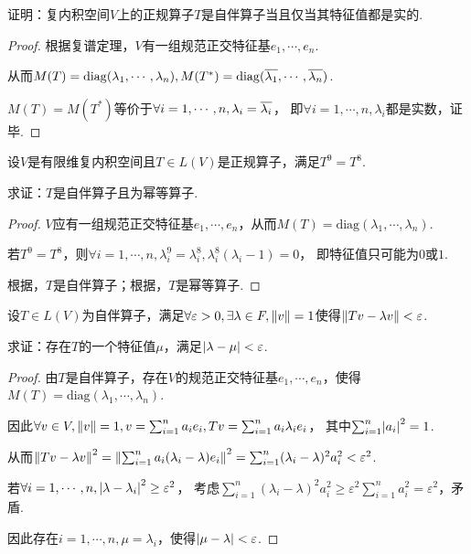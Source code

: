 \begin{problem}[6]\label{7.B.6}
    证明：复内积空间\(V\)上的正规算子\(T\)是自伴算子当且仅当其特征值都是实的.
\end{problem}

\begin{proof}
    根据复谱定理，\(V\)有一组规范正交特征基\(e_1,\cdots,e_n\).

    从而\(M(T)=\mathrm{diag}(\lambda_1,\cdots,\lambda_n),M(T^*)=\mathrm{diag}(\ol{\lambda_1},\cdots,\ol{\lambda_n})\).
    
    \(M(T)=M(T^*)\)等价于\(\forall i=1,\cdots,n,\lambda_i=\ol{\lambda_i}\)，
    即\(\forall i=1,\cdots,n,\lambda_i\)都是实数，证毕.
\end{proof}

\begin{problem}[8]\label{7.B.8}
    设\(V\)是有限维复内积空间且\(T \in L(V)\)是正规算子，满足\(T^9=T^8\).

    求证：\(T\)是自伴算子且为幂等算子.
\end{problem}

\begin{proof}
    \(V\)应有一组规范正交特征基\(e_1,\cdots,e_n\)，从而\(M(T)=\mathrm{diag}(\lambda_1,\cdots,\lambda_n)\).

    若\(T^9=T^8\)，则\(\forall i=1,\cdots,n,\lambda_i^9=\lambda_i^8,\lambda_i^8(\lambda_i-1)=0\)，
    即特征值只可能为\(0\)或\(1\).

    根据，\(T\)是自伴算子；根据，\(T\)是幂等算子.
\end{proof}

\begin{problem}[12]\label{7.B.12}
    设\(T \in L(V)\)为自伴算子，满足\(\forall \varepsilon>0,\exists \lambda \in F,\norm*{v}=1\)使得\(\norm*{Tv-\lambda v}<\varepsilon\).

    求证：存在\(T\)的一个特征值\(\mu\)，满足\(\abs*{\lambda-\mu}<\varepsilon\).
\end{problem}

\begin{proof}
    由\(T\)是自伴算子，存在\(V\)的规范正交特征基\(e_1,\cdots,e_n\)，使得\(M(T)=\mathrm{diag}(\lambda_1,\cdots,\lambda_n)\).

    因此\(\forall v \in V,\norm*{v}=1,v=\sum_{i=1}^n a_ie_i,Tv=\sum_{i=1}^n a_i\lambda_ie_i\)，
    其中\(\sum_{i=1}^n \abs*{a_i}^2=1\).

    从而\(\norm*{Tv-\lambda v}^2=\norm*{\sum_{i=1}^n a_i(\lambda_i-\lambda)e_i}^2=\sum_{i=1}^n(\lambda_i-\lambda)^2 a_i^2<\varepsilon^2\).

    若\(\forall i=1,\cdots,n,\abs*{\lambda-\lambda_i}^2 \geq \varepsilon^2\)，
    考虑\(\sum_{i=1}^n(\lambda_i-\lambda)^2 a_i^2 \geq \varepsilon^2 \sum_{i=1}^n a_i^2=\varepsilon^2\)，矛盾.

    因此存在\(i=1,\cdots,n,\mu=\lambda_i\)，使得\(\abs*{\mu-\lambda}<\varepsilon\).
\end{proof}

